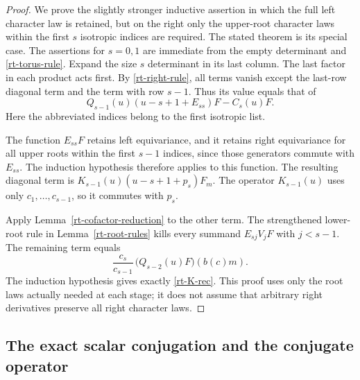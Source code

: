 \begin{proof}
We prove the slightly stronger inductive assertion in which
the full left character law is retained, but on the right
only the upper-root character laws within the first $s$
isotropic indices are required.  The stated theorem is
its special case.
The assertions for $s=0,1$ are immediate from the
empty determinant and \eqref{rt-torus-rule}.
Expand the size $s$ determinant in its last column.
The last factor in each product acts first.
By \eqref{rt-right-rule}, all terms vanish except
the last-row diagonal term and the term with row
$s-1$.  Thus its value equals that of
\[
 Q_{s-1}(u)(u-s+1+E_{ss})F-C_s(u)F.
\]
Here the abbreviated indices belong to the first
isotropic list.

The function $E_{ss}F$ retains left equivariance,
and it retains right equivariance for all upper
roots within the first $s-1$ indices, since those
generators commute with $E_{ss}$.
The induction hypothesis therefore applies to
this function.  The resulting diagonal term is
$K_{s-1}(u)(u-s+1+p_s)F_m$.
The operator $K_{s-1}(u)$ uses only
$c_1,\ldots,c_{s-1}$, so it commutes with $p_s$.

Apply Lemma~\ref{rt-cofactor-reduction} to the
other term.  The strengthened lower-root rule
in Lemma~\ref{rt-root-rules} kills every summand
$E_{sj}V_jF$ with $j<s-1$.  The remaining term
equals
\[
 \frac{c_s}{c_{s-1}}\,
       \bigl(Q_{s-2}(u)F\bigr)(b(c)m).
\]
The induction hypothesis gives exactly
\eqref{rt-K-rec}.  This proof uses only the root
laws actually needed at each stage; it does not
assume that arbitrary right derivatives preserve
all right character laws.
\end{proof}

\subsection{The exact scalar conjugation and the conjugate operator}

